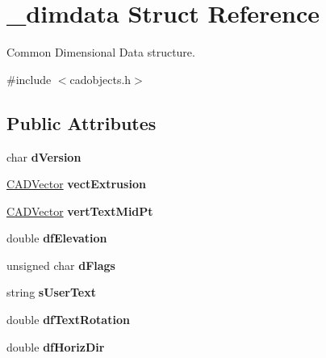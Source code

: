 \hypertarget{struct__dimdata}{}\section{\+\_\+dimdata Struct Reference}
\label{struct__dimdata}


Common Dimensional Data structure.  




{\ttfamily \#include $<$cadobjects.\+h$>$}

\subsection*{Public Attributes}
\begin{DoxyCompactItemize}
\item 
char {\bfseries d\+Version}\hypertarget{struct__dimdata_ad8f52c16041ac42aa56b7a6cd31e169e}{}\label{struct__dimdata_ad8f52c16041ac42aa56b7a6cd31e169e}

\item 
\hyperlink{class_c_a_d_vector}{C\+A\+D\+Vector} {\bfseries vect\+Extrusion}\hypertarget{struct__dimdata_a569d50b95d62dd1ce17cb223f0e87140}{}\label{struct__dimdata_a569d50b95d62dd1ce17cb223f0e87140}

\item 
\hyperlink{class_c_a_d_vector}{C\+A\+D\+Vector} {\bfseries vert\+Text\+Mid\+Pt}\hypertarget{struct__dimdata_a758bc9684249b873759e3061950c1eb4}{}\label{struct__dimdata_a758bc9684249b873759e3061950c1eb4}

\item 
double {\bfseries df\+Elevation}\hypertarget{struct__dimdata_a12a9d01768259406b7bfe9a38f71260f}{}\label{struct__dimdata_a12a9d01768259406b7bfe9a38f71260f}

\item 
unsigned char {\bfseries d\+Flags}\hypertarget{struct__dimdata_af97398ca76d435573a0e9279e92f221d}{}\label{struct__dimdata_af97398ca76d435573a0e9279e92f221d}

\item 
string {\bfseries s\+User\+Text}\hypertarget{struct__dimdata_a6c2ae6e85e545686419c5c23a81aabc9}{}\label{struct__dimdata_a6c2ae6e85e545686419c5c23a81aabc9}

\item 
double {\bfseries df\+Text\+Rotation}\hypertarget{struct__dimdata_ae1767ec3257dac2c8054c2a5f22d94bc}{}\label{struct__dimdata_ae1767ec3257dac2c8054c2a5f22d94bc}

\item 
double {\bfseries df\+Horiz\+Dir}\hypertarget{struct__dimdata_a2a50b0a20701a3059427cfc95772fb45}{}\label{struct__dimdata_a2a50b0a20701a3059427cfc95772fb45}


\end{DoxyCompactItemize}
